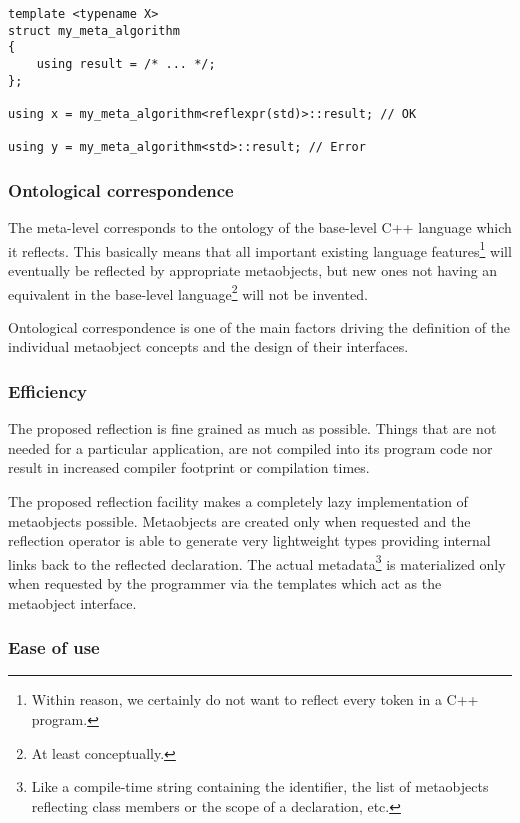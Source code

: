 \begin{verbatim}
template <typename X>
struct my_meta_algorithm
{
	using result = /* ... */;
};

using x = my_meta_algorithm<reflexpr(std)>::result; // OK

using y = my_meta_algorithm<std>::result; // Error

\end{verbatim}

\subsubsection{Ontological correspondence}
\label{design-onto-corr}

The meta-level 
corresponds to the ontology of the base-level C++ language
which it reflects. This basically means that all important existing language
features\footnote{Within reason, we certainly do not want to reflect every token
in a C++ program.} will eventually be reflected by appropriate metaobjects,
but new ones not having an equivalent in the base-level language\footnote{At least
conceptually.} will not be invented.

Ontological correspondence is one of the main factors driving the definition of the
individual metaobject concepts and the design of their interfaces.


\subsubsection{Efficiency}
\label{design-efficiency}

The proposed reflection is fine grained as much as possible.
Things that are not needed for a particular application,
are not compiled into its program code nor result in
increased compiler footprint or compilation times.

The proposed reflection facility makes a completely lazy implementation of
metaobjects possible. Metaobjects are created only when requested and
the reflection operator is able to generate very
lightweight types providing internal links back to the reflected declaration.
The actual
metadata\footnote{Like a compile-time string containing the identifier,
the list of metaobjects reflecting class members or the scope of a declaration,
etc.} is materialized only when requested by the programmer via the
templates which act as the metaobject interface.

\subsubsection{Ease of use}
\label{design-ease-of-use}

